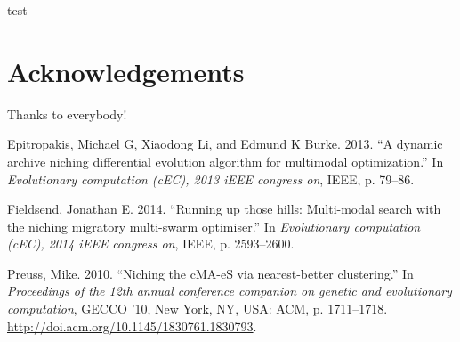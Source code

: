 \documentclass[12pt,a4paper]{article}
\begin{document}
test

\section{Acknowledgements}\label{acknowledgements}

Thanks to everybody! \newpage

\hypertarget{refs}{}
\hypertarget{ref-epitropakisux5f2013}{}
Epitropakis, Michael G, Xiaodong Li, and Edmund K Burke. 2013. ``A
dynamic archive niching differential evolution algorithm for multimodal
optimization.'' In \emph{Evolutionary computation (cEC), 2013 iEEE
congress on}, IEEE, p. 79--86.

\hypertarget{ref-fieldsendux5f2014}{}
Fieldsend, Jonathan E. 2014. ``Running up those hills: Multi-modal
search with the niching migratory multi-swarm optimiser.'' In
\emph{Evolutionary computation (cEC), 2014 iEEE congress on}, IEEE, p.
2593--2600.

\hypertarget{ref-preussux5f2010}{}
Preuss, Mike. 2010. ``Niching the cMA-eS via nearest-better
clustering.'' In \emph{Proceedings of the 12th annual conference
companion on genetic and evolutionary computation}, GECCO '10, New York,
NY, USA: ACM, p. 1711--1718.
\url{http://doi.acm.org/10.1145/1830761.1830793}.
\end{document}
